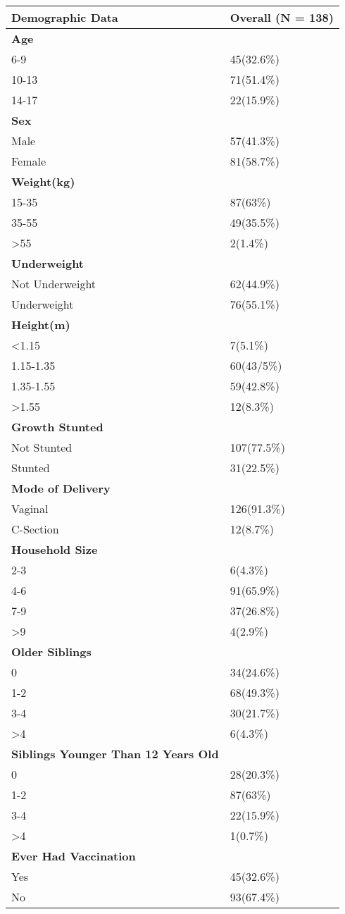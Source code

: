 \documentclass[6pt,letterpaper]{article}
\begin{document}
\begin{tabular}{|l  l|}
\hline
\textbf{Demographic Data} & \textbf{Overall (N = 138)} \\
 \hline
 \textbf{Age} & \\
 \hline
 6-9 & 45(32.6\%) \\
 10-13 & 71(51.4\%) \\
 14-17 & 22(15.9\%) \\
 \hline
 \textbf{Sex} & \\
 \hline
 Male & 57(41.3\%) \\
 Female & 81(58.7\%) \\
 \hline
 \textbf{Weight(kg)} & \\
15-35 & 87(63\%) \\
35-55 & 49(35.5\%) \\
\textgreater 55 & 2(1.4\%) \\
 \hline
 \textbf{Underweight} & \\
 Not Underweight & 62(44.9\%) \\
 Underweight & 76(55.1\%) \\
 \hline
 \textbf{Height(m)} & \\
 \hline
 \textless 1.15 & 7(5.1\%) \\
 1.15-1.35 & 60(43/5\%) \\
 1.35-1.55 & 59(42.8\%) \\
 \textgreater 1.55 & 12(8.3\%) \\
 \hline
 \textbf{Growth Stunted} & \\
 \hline
 Not Stunted & 107(77.5\%) \\
 Stunted & 31(22.5\%) \\
 \hline
 \textbf{Mode of Delivery} & \\
 \hline
 Vaginal & 126(91.3\%) \\
 C-Section & 12(8.7\%) \\
 \hline
 \textbf{Household Size} \\
 \hline
 2-3 & 6(4.3\%) \\
 4-6 & 91(65.9\%) \\
 7-9 & 37(26.8\%) \\
 \textgreater 9 & 4(2.9\%) \\
 \hline
 \textbf{Older Siblings} \\
 \hline
 0 & 34(24.6\%) \\
 1-2 & 68(49.3\%) \\
 3-4 & 30(21.7\%) \\
 \textgreater 4 & 6(4.3\%) \\
 \hline
 \textbf{Siblings Younger Than 12 Years Old} \\
 \hline
 0 & 28(20.3\%) \\
 1-2 & 87(63\%) \\
 3-4 & 22(15.9\%) \\
 \textgreater 4 & 1(0.7\%) \\
 \hline
 \textbf{Ever Had Vaccination} \\
 \hline
 Yes & 45(32.6\%) \\
 No & 93(67.4\%) \\
 \hline
 \end{tabular}
 
\end{document}
